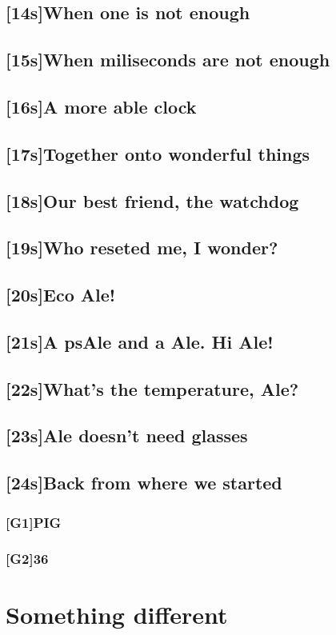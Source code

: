 \documentclass[12pt, a4paper]{book}
\begin{document}
\section{[14s]When one is not enough}
\section{[15s]When miliseconds are not enough}
\section{[16s]A more able clock}
\section{[17s]Together onto wonderful things}
\section{[18s]Our best friend, the watchdog}
\section{[19s]Who reseted me, I wonder?}
\section{[20s]Eco Ale!}
\section{[21s]A psAle and a Ale. Hi Ale!}
\section{[22s]What's the temperature, Ale?}
\section{[23s]Ale doesn't need glasses}
\section{[24s]Back from where we started}
\subsection{[G1]PIG}
\subsection{[G2]36}
\chapter{Something different}
\end{document}
